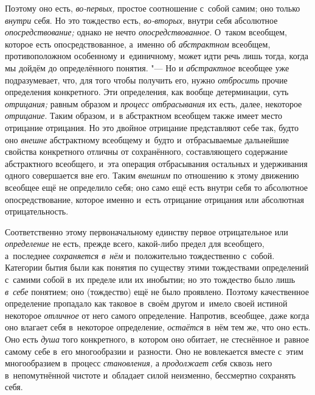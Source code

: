 Поэтому оно есть, {\em во-первых,} простое соотношение с~собой самим; оно
только {\em внутри} себя. Но это тождество есть, {\em во-вторых,} внутри себя
абсолютное {\em опосредствование;} однако не нечто {\em опосредствованное}.
О~таком всеобщем, которое есть опосредствованное, а~именно об {\em абстрактном}
всеобщем, противоположном особенному и~единичному, может идти речь лишь тогда,
когда мы дойдём до определённого понятия. "--- Но и {\em абстрактное} всеобщее
уже подразумевает, что, для того чтобы получить его, нужно {\em отбросить}
прочие определения конкретного. Эти определения, как вообще детерминации, суть
{\em отрицания;} равным образом и {\em процесс отбрасывания} их есть, далее,
некоторое {\em отрицание}. Таким образом, и~в абстрактном всеобщем также имеет
место отрицание отрицания. Но это двойное отрицание представляют себе так,
будто оно {\em внешне} абстрактному всеобщему и~будто и~отбрасываемые
дальнейшие свойства конкретного отличны от сохранённого, составляющего
содержание абстрактного всеобщего, и~эта операция отбрасывания остальных и
удерживания одного совершается вне его. Таким {\em внешним} по отношению к
этому движению всеобщее ещё не определило себя; оно само ещё есть внутри себя
то абсолютное опосредствование, которое именно и~есть отрицание отрицания или
абсолютная отрицательность.

Соответственно этому первоначальному единству первое отрицательное или
{\em определение} не есть, прежде всего, какой-либо предел для всеобщего,
а~последнее {\em сохраняется в~нём} и~положительно тождественно с~собой.
Категории бытия были как понятия по существу этими тождествами определений
с~самими собой в~их пределе или их инобытии; но это тождество было лишь
{\em в~себе} понятием; оно (тождество) ещё не было проявлено. Поэтому
качественное определение пропадало как таковое в~своём другом и~имело своей
истиной некоторое {\em отличное} от него самого определение. Напротив,
всеобщее, даже когда оно влагает себя в~некоторое определение, {\em остаётся}
в~нём тем же, что оно есть. Оно есть {\em душа} того конкретного, в~котором оно
обитает, не стеснённое и~равное самому себе в~его многообразии и~разности. Оно
не вовлекается вместе с~этим многообразием в~процесс {\em становления,}
а {\em продолжает себя} сквозь него в~непомутнённой чистоте и~обладает силой
неизменно, бессмертно сохранять себя.

